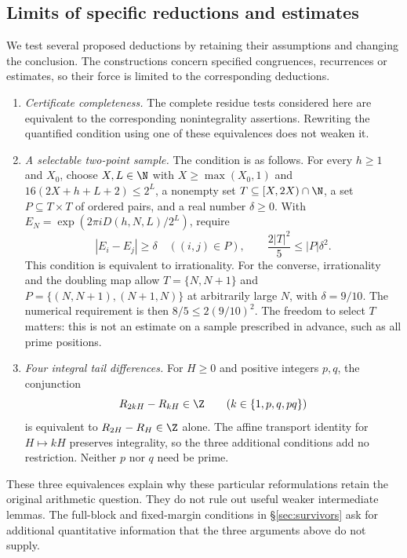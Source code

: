 \subsection{Limits of specific reductions and estimates}

We test several proposed deductions by retaining their assumptions
and changing the conclusion. The constructions concern specified
congruences, recurrences or estimates, so their force is limited to
the corresponding deductions.


\begin{prop}
\label{prop:b2}
\begin{enumerate}[label=(\alph*),leftmargin=*]
\item \emph{Certificate completeness.} The complete residue tests considered here are
  equivalent to the corresponding nonintegrality assertions. Rewriting the
  quantified condition using one of these equivalences does not weaken it.
\item \emph{A selectable two-point sample.} The condition is as follows.
  For every $h\ge1$ and $X_0$, choose $X,L\in\N$ with
  $X\ge\max(X_0,1)$ and $16(2X+h+L+2)\le2^L$, a nonempty set
  $T\subseteq[X,2X)\cap\N$, a set $P\subseteq T\times T$ of ordered
  pairs, and a real number $\delta\ge0$. With
  $E_N=\exp(2\pi iD(h,N,L)/2^L)$, require
  \[
   |E_i-E_j|\ge\delta\quad((i,j)\in P),\qquad
   \frac{2|T|^2}{5}\le |P|\delta^2.
  \]
  This condition is equivalent to irrationality. For the converse,
  irrationality and the doubling map allow
  $T=\{N,N+1\}$ and $P=\{(N,N+1),(N+1,N)\}$ at arbitrarily large $N$,
  with $\delta=9/10$. The numerical requirement is then
  $8/5\le2(9/10)^2$. The freedom to select $T$ matters: this is not an
  estimate on a sample prescribed in advance, such as all prime positions.

\item \emph{Four integral tail differences.} For $H\ge0$ and positive
  integers $p,q$, the conjunction
  \[
   R_{2kH}-R_{kH}\in\Z\qquad(k\in\{1,p,q,pq\})
  \]
  is equivalent to $R_{2H}-R_H\in\Z$ alone. The affine transport identity
  for $H\mapsto kH$ preserves integrality, so the three additional
  conditions add no restriction. Neither $p$ nor $q$ need be prime.
\end{enumerate}
These three equivalences explain why these particular reformulations
retain the original arithmetic question. They do not rule out useful weaker
intermediate lemmas. The full-block and fixed-margin conditions in
\S\ref{sec:survivors} ask for additional quantitative information that the
three arguments above do not supply.
\end{prop}

